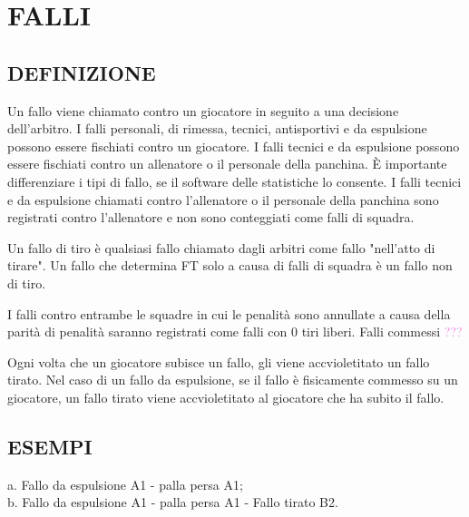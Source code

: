 \section{FALLI}
\sectionline
\subsection{DEFINIZIONE}
\subsectionline

Un fallo viene chiamato contro un giocatore in seguito a una decisione dell'arbitro. I falli personali, di rimessa, tecnici, antisportivi e da espulsione possono essere fischiati contro un giocatore. I falli tecnici e da espulsione possono essere fischiati contro un allenatore o il personale della panchina. È importante differenziare i tipi di fallo, se il software delle statistiche lo consente. I falli tecnici e da espulsione chiamati contro l'allenatore o il personale della panchina 
sono registrati contro l'allenatore e non sono conteggiati come falli di squadra.

Un fallo di tiro è qualsiasi fallo chiamato dagli arbitri come fallo "nell'atto di tirare". Un fallo che determina FT solo a causa di falli di squadra è un fallo 
non di tiro.

I falli contro entrambe le squadre in cui le penalità sono annullate a causa della parità di penalità saranno registrati come falli con 0 tiri liberi. Falli commessi \textcolor{violet}{???}

Ogni volta che un giocatore subisce un fallo, gli viene accvioletitato un fallo tirato. Nel caso di un fallo da espulsione, se il fallo è fisicamente commesso su un giocatore, un fallo tirato viene accvioletitato al giocatore che ha subito il fallo.

\subsection{ESEMPI}
\subsectionline
{}


{a. Fallo da espulsione A1 - palla persa A1;
\\b. Fallo da espulsione A1 - palla persa A1 - Fallo tirato B2.}
